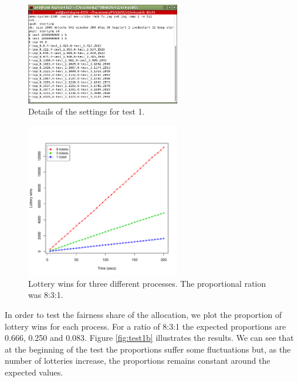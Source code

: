 \documentclass[10pt]{scrartcl}
\begin{document}
\begin{figure}
  \centering
  \includegraphics[width=0.6\textwidth]{test1.png}
  \caption{Details of the settings for test 1.}\label{fig:test1}
\end{figure}

\begin{figure}
  \centering
  \includegraphics[width=0.6\textwidth]{test1a}
  \caption{Lottery wins for three different processes. The proportional ration was 8:3:1.}\label{fig:test1a}
\end{figure}

In order to test the fairness share of the allocation, we plot the proportion of lottery wins for each process.  For a ratio of 8:3:1 the expected proportions are 0.666, 0.250 and 0.083.  Figure \ref{fig:test1b} illustrates the results.  We can see that at the beginning of the test the proportions suffer some fluctuations but, as the number of lotteries increase, the proportions remains constant around the expected values.
\end{document}
